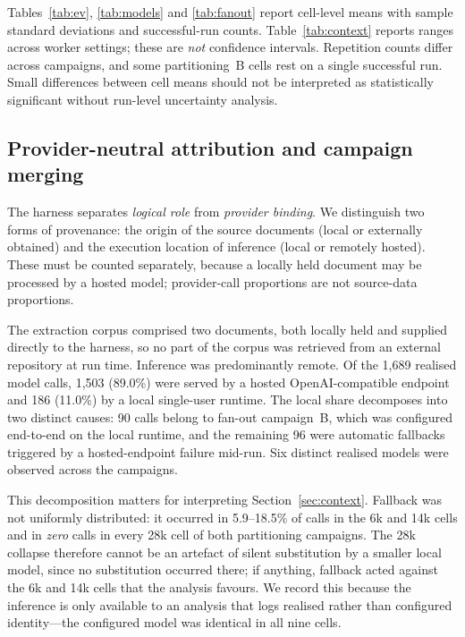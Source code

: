 \documentclass[conference]{IEEEtran}
\begin{document}
Tables~\ref{tab:ev}, \ref{tab:models} and \ref{tab:fanout} report cell-level means with sample standard deviations and successful-run counts. Table~\ref{tab:context} reports ranges across worker settings; these are \emph{not} confidence intervals. Repetition counts differ across campaigns, and some partitioning~B cells rest on a single successful run. Small differences between cell means should not be interpreted as statistically significant without run-level uncertainty analysis.

\subsection{Provider-neutral attribution and campaign merging}
The harness separates \emph{logical role} from \emph{provider binding}. We distinguish two forms of provenance: the origin of the source documents (local or externally obtained) and the execution location of inference (local or remotely hosted). These must be counted separately, because a locally held document may be processed by a hosted model; provider-call proportions are not source-data proportions.

The extraction corpus comprised two documents, both locally held and supplied directly to the harness, so no part of the corpus was retrieved from an external repository at run time. Inference was predominantly remote. Of the 1{,}689 realised model calls, 1{,}503 (89.0\%) were served by a hosted OpenAI-compatible endpoint and 186 (11.0\%) by a local single-user runtime. The local share decomposes into two distinct causes: 90 calls belong to fan-out campaign~B, which was configured end-to-end on the local runtime, and the remaining 96 were automatic fallbacks triggered by a hosted-endpoint failure mid-run. Six distinct realised models were observed across the campaigns.

This decomposition matters for interpreting Section~\ref{sec:context}. Fallback was not uniformly distributed: it occurred in 5.9--18.5\% of calls in the 6k and 14k cells and in \emph{zero} calls in every 28k cell of both partitioning campaigns. The 28k collapse therefore cannot be an artefact of silent substitution by a smaller local model, since no substitution occurred there; if anything, fallback acted against the 6k and 14k cells that the analysis favours. We record this because the inference is only available to an analysis that logs realised rather than configured identity---the configured model was identical in all nine cells.
\end{document}
